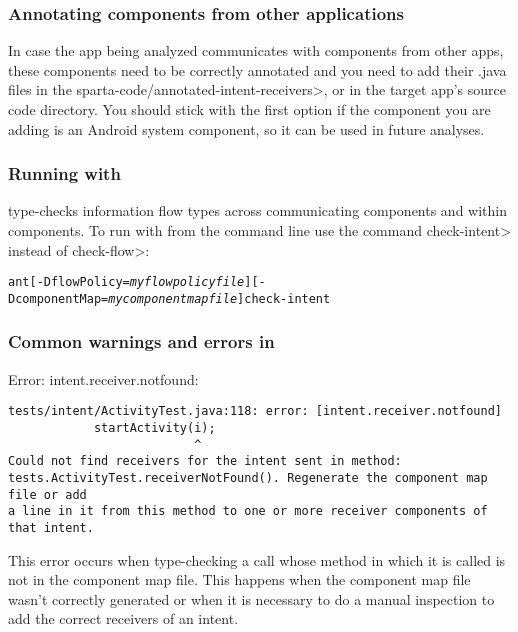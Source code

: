 \subsubsection{Annotating components from other applications}
In case the app being analyzed communicates with components from
other apps, these components need to be correctly annotated and you need to add
their .java files in the \<sparta-code/annotated-intent-receivers>, or in the
target app's source code directory. You should stick with the first option if the
component you are adding is an Android system component, so it can be used in
future analyses.

\subsubsection{Running \theIntentChecker{} with \theFlowChecker{}}

\TheIntentChecker{} type-checks information flow types across communicating
components and within components. To run \theIntentChecker{} with
\theFlowChecker{} from the command line use the command \<check-intent> instead
of \<check-flow>:

\begin{alltt}
    ant [-DflowPolicy=\textit{myflowpolicyfile}] [-DcomponentMap=\textit{mycomponentmapfile}] check-intent
\end{alltt}

\subsubsection{Common warnings and errors in \theIntentChecker{}}

\noindent
Error: intent.receiver.notfound:

\begin{Verbatim}
tests/intent/ActivityTest.java:118: error: [intent.receiver.notfound]
            startActivity(i);
                          ^
Could not find receivers for the intent sent in method:
tests.ActivityTest.receiverNotFound(). Regenerate the component map file or add
a line in it from this method to one or more receiver components of that intent.

\end{Verbatim}

This error occurs when type-checking a \sendIntent{} call whose method in which
it is called is not in the component map file. This happens when the component
map file wasn't correctly generated or when it is necessary to do a manual
inspection to add the correct receivers of an intent.

